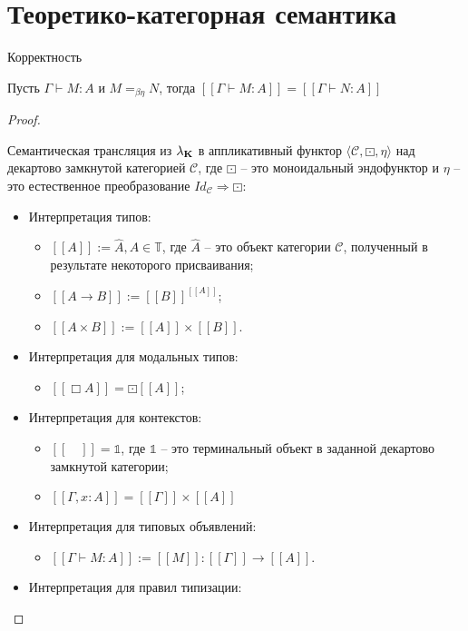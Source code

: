 \section{Теоретико-категорная семантика}

\begin{theorem} Корректность

  Пусть $\Gamma \vdash M : A$ и $M =_{\beta\eta} N$, тогда $[\![\Gamma \vdash M : A]\!] = [\![\Gamma \vdash N : A]\!]$
\end{theorem}

\begin{proof}

\begin{defin} Семантическая трансляция из $\lambda_{{\bf K}}$ в аппликативный функтор $\langle \mathcal{C}, \boxdot, \eta \rangle$ над декартово замкнутой категорией $\mathcal{C}$,
где $\boxdot$ -- это моноидальный эндофунктор и $\eta$ -- это естественное преобразование $Id_{\mathcal{C}} \Rightarrow \boxdot$:

\begin{itemize}
\item Интерпретация типов:
  \begin{itemize}
    \item $[\![A]\!] := \hat{A}, A \in \mathbb{T}$, где $\hat{A}$ -- это объект категории $\mathcal{C}$, полученный в результате некоторого присваивания;
    \item $[\![A \to B]\!] := [\![B]\!]^{[\![A]\!]}$;
    \item $[\![A \times B]\!] := [\![A]\!] \times [\![B]\!]$.
  \end{itemize}
\item Интерпретация для модальных типов:
  \begin{itemize}
    \item $[\![\Box A]\!] = \boxdot[\![A]\!]$;
  \end{itemize}
\item Интерпретация для контекстов:
  \begin{itemize}
    \item $[\![ \quad ]\!] = \mathds{1}$, где $\mathds{1}$ -- это терминальный объект в заданной декартово замкнутой категории;
    \item $[\![\Gamma, x : A]\!] = [\![\Gamma]\!] \times [\![A]\!]$
  \end{itemize}
\item Интерпретация для типовых объявлений:
  \begin{itemize}
    \item $[\![\Gamma \vdash M : A]\!] := [\![M]\!] : [\![\Gamma]\!] \to [\![A]\!]$.
  \end{itemize}
\item Интерпретация для правил типизации:


\end{itemize}
\end{defin}
\end{proof}
